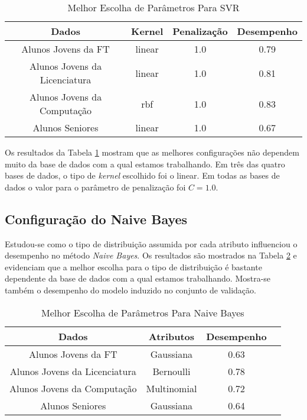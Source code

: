 \begin{table}
\caption{Melhor Escolha de Parâmetros Para SVR}
\begin{center}
\begin{tabular}[c]{| c | c | c | c |}
    \hline
    \textbf{Dados} & \textbf{Kernel} & \textbf{Penalização} & \textbf{Desempenho}\\
    \hline
    Alunos Jovens da FT & linear & 1.0 & 0.79 \\
    \hline
    Alunos Jovens da Licenciatura & linear & 1.0 & 0.81 \\
    \hline
    Alunos Jovens da Computação & rbf & 1.0 & 0.83 \\
    \hline
    Alunos Seniores & linear & 1.0 & 0.67 \\
    \hline
\end{tabular}
\end{center}
\label{svr_conf}
\end{table}

Os resultados da Tabela \ref{svr_conf} mostram que as melhores configurações não
dependem muito da base de dados com a qual estamos trabalhando. Em três das quatro
bases de dados, o tipo de \textit{kernel} escolhido foi o linear. Em todas as bases
de dados o valor para o parâmetro de penalização foi $C = 1.0$.   

\subsection{Configuração do Naive Bayes} \label{nb_best_conf}
Estudou-se como o tipo de distribuição assumida por cada atributo influenciou o
desempenho no método \textit{Naive Bayes}. Os resultados são mostrados na Tabela
\ref{conf_nb} e evidenciam que a melhor escolha para o tipo de distribuição é
bastante dependente da base de dados com a qual estamos trabalhando. Mostra-se também
o desempenho do modelo induzido no conjunto de validação. 

\begin{table}
\caption{Melhor Escolha de Parâmetros Para Naive Bayes}
\begin{center}
\begin{tabular}[c]{| c | c | c | c |}
    \hline
    \textbf{Dados} & \textbf{Atributos} & \textbf{Desempenho} \\
    \hline
    Alunos Jovens da FT & Gaussiana & 0.63 \\
    \hline
    Alunos Jovens da Licenciatura & Bernoulli & 0.78 \\
    \hline
    Alunos Jovens da Computação & Multinomial & 0.72 \\
    \hline
    Alunos Seniores & Gaussiana & 0.64 \\
    \hline
\end{tabular}
\end{center}
\label{conf_nb}
\end{table}

